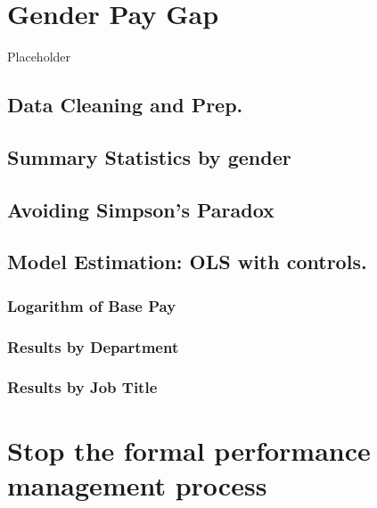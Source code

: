 \documentclass[12pt, krantz2,]{krantz}
\begin{document}
\hypertarget{pay-gap}{%
\chapter{Gender Pay Gap}\label{pay-gap}}

Placeholder

\hypertarget{data-cleaning-and-prep.}{%
\section{Data Cleaning and Prep.}\label{data-cleaning-and-prep.}}

\hypertarget{summary-statistics-by-gender}{%
\section{Summary Statistics by gender}\label{summary-statistics-by-gender}}

\hypertarget{avoiding-simpsons-paradox}{%
\section{Avoiding Simpson's Paradox}\label{avoiding-simpsons-paradox}}

\hypertarget{model-estimation-ols-with-controls.}{%
\section{Model Estimation: OLS with controls.}\label{model-estimation-ols-with-controls.}}

\hypertarget{logarithm-of-base-pay}{%
\subsection{Logarithm of Base Pay}\label{logarithm-of-base-pay}}

\hypertarget{results-by-department}{%
\subsection{Results by Department}\label{results-by-department}}

\hypertarget{results-by-job-title}{%
\subsection{Results by Job Title}\label{results-by-job-title}}

\hypertarget{stop-appraisals}{%
\chapter{Stop the formal performance management process}\label{stop-appraisals}}
\end{document}
